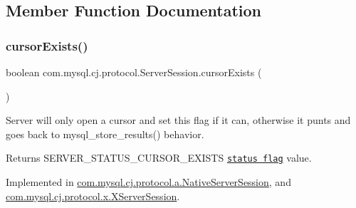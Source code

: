 \subsection{Member Function Documentation}
\mbox{\label{interfacecom_1_1mysql_1_1cj_1_1protocol_1_1_server_session_aee37dfcad7c37e0b031da85b7f638435}} 
\subsubsection{\texorpdfstring{cursor\+Exists()}{cursorExists()}}
{\footnotesize\ttfamily boolean com.\+mysql.\+cj.\+protocol.\+Server\+Session.\+cursor\+Exists (\begin{DoxyParamCaption}{ }\end{DoxyParamCaption})}

Server will only open a cursor and set this flag if it can, otherwise it punts and goes back to mysql\+\_\+store\+\_\+results() behavior.

\begin{DoxyReturn}{Returns}
S\+E\+R\+V\+E\+R\+\_\+\+S\+T\+A\+T\+U\+S\+\_\+\+C\+U\+R\+S\+O\+R\+\_\+\+E\+X\+I\+S\+TS \href{http://dev.mysql.com/doc/internals/en/status-flags.html}{\tt status flag} value. 
\end{DoxyReturn}


Implemented in \mbox{\hyperlink{classcom_1_1mysql_1_1cj_1_1protocol_1_1a_1_1_native_server_session_a9e04d0827dc182b812bde510a82952c1}{com.\+mysql.\+cj.\+protocol.\+a.\+Native\+Server\+Session}}, and \mbox{\hyperlink{classcom_1_1mysql_1_1cj_1_1protocol_1_1x_1_1_x_server_session_a4631fd33459ee83b06f167ba96e9218a}{com.\+mysql.\+cj.\+protocol.\+x.\+X\+Server\+Session}}.

\mbox{\label{interfacecom_1_1mysql_1_1cj_1_1protocol_1_1_server_session_a080efb1043278f9c6d13f7dc24d18476}} 
